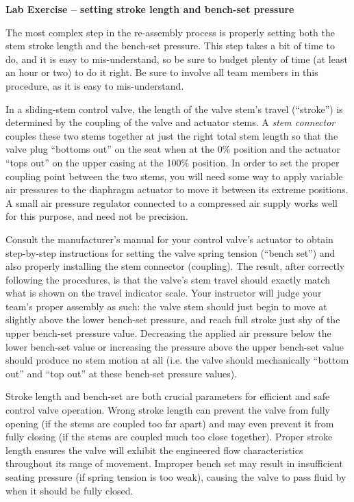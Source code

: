\documentclass[12pt,a4paper]{article}
\begin{document}
\begin{itemize}
\vfil \eject

\noindent
{\bf Lab Exercise -- setting stroke length and bench-set pressure}

\vskip 5pt

The most complex step in the re-assembly process is properly setting both the stem stroke length and the bench-set pressure.  This step takes a bit of time to do, and it is easy to mis-understand, so be sure to budget plenty of time (at least an hour or two) to do it right.  Be sure to involve all team members in this procedure, as it is easy to mis-understand.

In a sliding-stem control valve, the length of the valve stem's travel (``stroke'') is determined by the coupling of the valve and actuator stems.  A {\it stem connector} couples these two stems together at just the right total stem length so that the valve plug ``bottoms out'' on the seat when at the 0\% position and the actuator ``tops out'' on the upper casing at the 100\% position.  In order to set the proper coupling point between the two stems, you will need some way to apply variable air pressures to the diaphragm actuator to move it between its extreme positions.  A small air pressure regulator connected to a compressed air supply works well for this purpose, and need not be precision.

\vskip 10pt

Consult the manufacturer's manual for your control valve's actuator to obtain step-by-step instructions for setting the valve spring tension (``bench set'') and also properly installing the stem connector (coupling).  The result, after correctly following the procedures, is that the valve's stem travel should exactly match what is shown on the travel indicator scale.  Your instructor will judge your team's proper assembly as such: the valve stem should just begin to move at slightly above the lower bench-set pressure, and reach full stroke just shy of the upper bench-set pressure value.  Decreasing the applied air pressure below the lower bench-set value or increasing the pressure above the upper bench-set value should produce no stem motion at all (i.e. the valve should mechanically ``bottom out'' and ``top out'' at these bench-set pressure values).

\vskip 10pt

Stroke length and bench-set are both crucial parameters for efficient and safe control valve operation.  Wrong stroke length can prevent the valve from fully opening (if the stems are coupled too far apart) and may even prevent it from fully closing (if the stems are coupled much too close together).  Proper stroke length ensures the valve will exhibit the engineered flow characteristics throughout its range of movement.  Improper bench set may result in insufficient seating pressure (if spring tension is too weak), causing the valve to pass fluid by when it should be fully closed.


\end{itemize}
\end{document}
